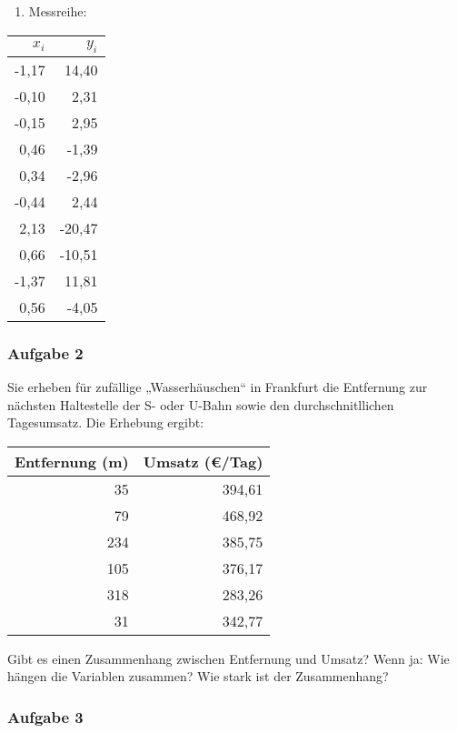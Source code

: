 \documentclass[
  ngerman,
]{article}
\providecommand{\tightlist}{%
  \setlength{\itemsep}{0pt}\setlength{\parskip}{0pt}}
\begin{document}
\begin{enumerate}
\def\labelenumi{\alph{enumi})}
\setcounter{enumi}{1}
\tightlist
\item
  Messreihe:
\end{enumerate}

\begin{table}
\centering
\begin{tabular}{rr}
\toprule
$x_i$ & $y_i$\\
\midrule
-1,17 & 14,40\\
-0,10 & 2,31\\
-0,15 & 2,95\\
0,46 & -1,39\\
0,34 & -2,96\\
-0,44 & 2,44\\
2,13 & -20,47\\
0,66 & -10,51\\
-1,37 & 11,81\\
0,56 & -4,05\\
\bottomrule
\end{tabular}
\end{table}

\hypertarget{aufgabe-2-6}{%
\subsubsection{Aufgabe 2}\label{aufgabe-2-6}}

Sie erheben für zufällige „Wasserhäuschen`` in Frankfurt die Entfernung zur nächsten Haltestelle der S- oder U-Bahn sowie den durchschnitllichen Tagesumsatz. Die Erhebung ergibt:

\begin{table}
\centering
\begin{tabular}{rr}
\toprule
Entfernung (m) & Umsatz (€/Tag)\\
\midrule
35 & 394,61\\
79 & 468,92\\
234 & 385,75\\
105 & 376,17\\
318 & 283,26\\
31 & 342,77\\
\bottomrule
\end{tabular}
\end{table}

Gibt es einen Zusammenhang zwischen Entfernung und Umsatz? Wenn ja: Wie hängen die Variablen zusammen? Wie stark ist der Zusammenhang?

\hypertarget{aufgabe-3-4}{%
\subsubsection{Aufgabe 3}\label{aufgabe-3-4}}
\end{document}
